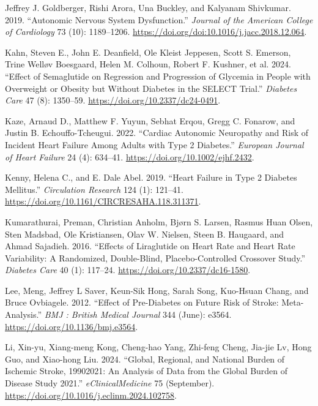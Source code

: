 \documentclass[
  a4paper,
  headsepline=true,
  open=any]{scrbook}
\newlength{\cslhangindent}
\newlength{\cslentryspacingunit} %
\newenvironment{CSLReferences}[2] %
 {%
  \setlength{\parindent}{0pt}
  \ifodd #1
  \let\oldpar\par
  \def\par{\hangindent=\cslhangindent\oldpar}
  \fi
  \setlength{\parskip}{#2\cslentryspacingunit}
 }%
 {}
\begin{document}
\begin{CSLReferences}{1}{0}
\leavevmode{}%
Jeffrey J. Goldberger, Rishi Arora, Una Buckley, and Kalyanam Shivkumar.
2019. {``Autonomic Nervous System Dysfunction.''} \emph{Journal of the
American College of Cardiology} 73 (10): 1189--1206.
\url{https://doi.org/doi:10.1016/j.jacc.2018.12.064}.

\leavevmode{}%
Kahn, Steven E., John E. Deanfield, Ole Kleist Jeppesen, Scott S.
Emerson, Trine Welløv Boesgaard, Helen M. Colhoun, Robert F. Kushner, et
al. 2024. {``Effect of Semaglutide on Regression and Progression of
Glycemia in People with Overweight or Obesity but Without Diabetes in
the SELECT Trial.''} \emph{Diabetes Care} 47 (8): 1350--59.
\url{https://doi.org/10.2337/dc24-0491}.

\leavevmode{}%
Kaze, Arnaud D., Matthew F. Yuyun, Sebhat Erqou, Gregg C. Fonarow, and
Justin B. Echouffo-Tcheugui. 2022. {``Cardiac Autonomic Neuropathy and
Risk of Incident Heart Failure Among Adults with Type 2 Diabetes.''}
\emph{European Journal of Heart Failure} 24 (4): 634--41.
\url{https://doi.org/10.1002/ejhf.2432}.

\leavevmode{}%
Kenny, Helena C., and E. Dale Abel. 2019. {``Heart Failure in Type 2
Diabetes Mellitus.''} \emph{Circulation Research} 124 (1): 121--41.
\url{https://doi.org/10.1161/CIRCRESAHA.118.311371}.

\leavevmode{}%
Kumarathurai, Preman, Christian Anholm, Bjørn S. Larsen, Rasmus Huan
Olsen, Sten Madsbad, Ole Kristiansen, Olav W. Nielsen, Steen B.
Haugaard, and Ahmad Sajadieh. 2016. {``Effects of Liraglutide on Heart
Rate and Heart Rate Variability: A Randomized, Double-Blind,
Placebo-Controlled Crossover Study.''} \emph{Diabetes Care} 40 (1):
117--24. \url{https://doi.org/10.2337/dc16-1580}.

\leavevmode{}%
Lee, Meng, Jeffrey L Saver, Keun-Sik Hong, Sarah Song, Kuo-Hsuan Chang,
and Bruce Ovbiagele. 2012. {``Effect of Pre-Diabetes on Future Risk of
Stroke: Meta-Analysis.''} \emph{BMJ : British Medical Journal} 344
(June): e3564. \url{https://doi.org/10.1136/bmj.e3564}.

\leavevmode{}%
Li, Xin-yu, Xiang-meng Kong, Cheng-hao Yang, Zhi-feng Cheng, Jia-jie Lv,
Hong Guo, and Xiao-hong Liu. 2024. {``Global, Regional, and National
Burden of Ischemic Stroke, 1990{\textendash}2021: An Analysis of Data
from the Global Burden of Disease Study 2021.''}
\emph{eClinicalMedicine} 75 (September).
\url{https://doi.org/10.1016/j.eclinm.2024.102758}.


\end{CSLReferences}
\end{document}
